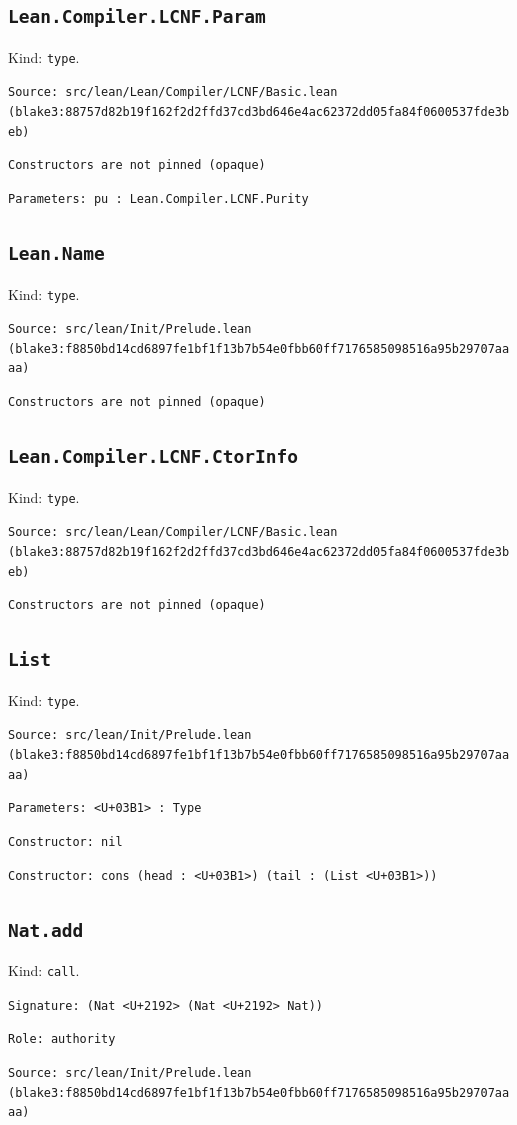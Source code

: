 \documentclass[11pt]{article}
\begin{document}
\subsection*{\texttt{Lean.Compiler.LCNF.Param}}
\noindent Kind: \texttt{type}.\par
\noindent \texttt{Source: src/lean/Lean/Compiler/LCNF/Basic.lean (blake3:88757d82b19f162f2d2ffd37cd3bd646e4ac62372dd05fa84f0600537fde3beb)}\par
\noindent \texttt{Constructors are not pinned (opaque)}\par
\noindent \texttt{Parameters: pu : Lean.Compiler.LCNF.Purity}\par
\subsection*{\texttt{Lean.Name}}
\noindent Kind: \texttt{type}.\par
\noindent \texttt{Source: src/lean/Init/Prelude.lean (blake3:f8850bd14cd6897fe1bf1f13b7b54e0fbb60ff7176585098516a95b29707aaaa)}\par
\noindent \texttt{Constructors are not pinned (opaque)}\par
\subsection*{\texttt{Lean.Compiler.LCNF.CtorInfo}}
\noindent Kind: \texttt{type}.\par
\noindent \texttt{Source: src/lean/Lean/Compiler/LCNF/Basic.lean (blake3:88757d82b19f162f2d2ffd37cd3bd646e4ac62372dd05fa84f0600537fde3beb)}\par
\noindent \texttt{Constructors are not pinned (opaque)}\par
\subsection*{\texttt{List}}
\noindent Kind: \texttt{type}.\par
\noindent \texttt{Source: src/lean/Init/Prelude.lean (blake3:f8850bd14cd6897fe1bf1f13b7b54e0fbb60ff7176585098516a95b29707aaaa)}\par
\noindent \texttt{Parameters: <U+03B1> : Type}\par
\noindent \texttt{Constructor: nil }\par
\noindent \texttt{Constructor: cons (head : <U+03B1>) (tail : (List <U+03B1>))}\par
\subsection*{\texttt{Nat.add}}
\noindent Kind: \texttt{call}.\par
\noindent \texttt{Signature: (Nat <U+2192> (Nat <U+2192> Nat))}\par
\noindent \texttt{Role: authority}\par
\noindent \texttt{Source: src/lean/Init/Prelude.lean (blake3:f8850bd14cd6897fe1bf1f13b7b54e0fbb60ff7176585098516a95b29707aaaa)}\par
\end{document}
